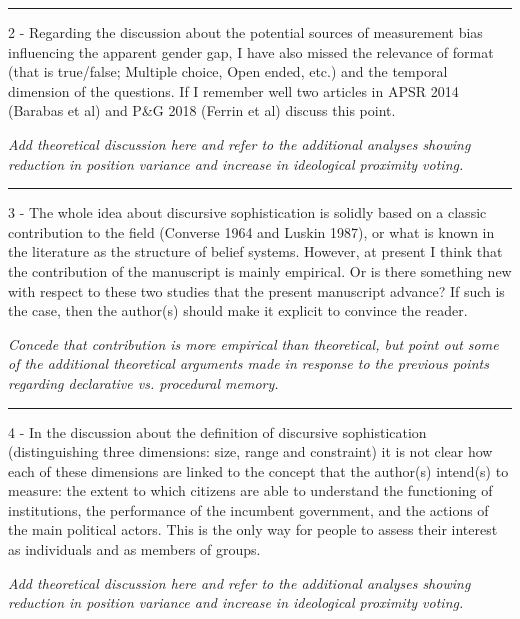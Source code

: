 \rule{\linewidth}{.01cm}

2 - Regarding the discussion about the potential sources of measurement bias influencing the apparent gender gap, I have also missed the relevance of format (that is true/false; Multiple choice, Open ended, etc.) and the temporal dimension of the questions. If I remember well two articles in APSR 2014 (Barabas et al) and P\&G 2018 (Ferrin et al) discuss this point.

\textit{Add theoretical discussion here and refer to the additional analyses showing reduction in position variance and increase in ideological proximity voting.}


\rule{\linewidth}{.01cm}

3 - The whole idea about discursive sophistication is solidly based on a classic contribution to the field (Converse 1964 and Luskin 1987), or what is known in the literature as the structure of belief systems. However, at present I think that the contribution of the manuscript is mainly empirical. Or is there something new with respect to these two studies that the present manuscript advance? If such is the case, then the author(s) should make it explicit to convince the reader.

\textit{Concede that contribution is more empirical than theoretical, but point out some of the additional theoretical arguments made in response to the previous points regarding declarative vs. procedural memory.}


\rule{\linewidth}{.01cm}

4 - In the discussion about the definition of discursive sophistication (distinguishing three dimensions: size, range and constraint) it is not clear how each of these dimensions are linked to the concept that the author(s) intend(s) to measure: the extent to which citizens are able to understand the functioning of institutions, the performance of the incumbent government, and the actions of the main political actors. This is the only way for people to assess their interest as individuals and as members of groups.

\textit{Add theoretical discussion here and refer to the additional analyses showing reduction in position variance and increase in ideological proximity voting.}


